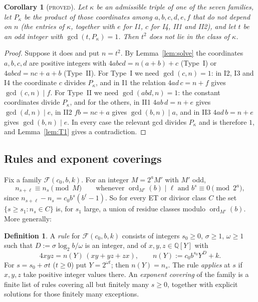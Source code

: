 \documentclass[11pt,reqno]{amsart}
\newtheorem{corollary}[theorem]{Corollary}
\theoremstyle{definition}
\newtheorem{definition}[theorem]{Definition}
\newcommand{\Q}{\mathbb Q}
\newcommand{\ord}{\operatorname{ord}}
\newcommand{\status}[1]{\textup{\textsc{#1}}}
\begin{document}
\begin{corollary}[\status{proved}]\label{cor:T1class}
Let $\kappa$ be an admissible triple of one of the seven families, let
$P_\kappa$ be the product of those coordinates among $a,b,c,d,e,f$ that do
not depend on $n$ \textup{(}the entries of $\kappa$, together with $e$ for
I1, $c$ for I4, II1 and II2\textup{)}, and let $t$ be an odd integer with
$\gcd(t,P_\kappa)=1$.  Then $t^2$ does not lie in the class of $\kappa$.
\end{corollary}

\begin{proof}
Suppose it does and put $n=t^2$.  By Lemma~\ref{lem:solve} the coordinates
$a,b,c,d$ are positive integers with $4abcd=n(a+b)+c$ (Type~I) or
$4abcd=nc+a+b$ (Type~II).  For Type~I we need $\gcd(c,n)=1$: in I2, I3 and
I4 the coordinate $c$ divides $P_\kappa$, and in I1 the relation $4ad\,c=n+f$
gives $\gcd(c,n)\mid f$.  For Type~II we need $\gcd(abd,n)=1$: the
constant coordinates divide $P_\kappa$, and for the others, in II1
$4ab\,d=n+e$ gives $\gcd(d,n)\mid e$, in II2 $fb=nc+a$ gives
$\gcd(b,n)\mid a$, and in II3 $4ad\,b=n+e$ gives $\gcd(b,n)\mid e$.  In
every case the relevant gcd divides $P_\kappa$ and is therefore $1$, and
Lemma~\ref{lem:T1} gives a contradiction.
\end{proof}

\subsection{Rules and exponent coverings}
Fix a family $\mathcal F(c_0,b,k)$.  For an integer $M=2^aM'$ with $M'$ odd,
\begin{equation}\label{eq:period}
 n_{s+\ell}\equiv n_s \pmod{M}\qquad\text{whenever } \ord_{M'}(b)\mid \ell \text{ and } b^s\equiv0\pmod{2^a},
\end{equation}
since $n_{s+\ell}-n_s=c_0b^s(b^\ell-1)$.  So for every ET or divisor class
$C$ the set $\{s\ge s_1: n_s\in C\}$ is, for $s_1$ large, a union of
residue classes modulo $\ord_{M'}(b)$.  More generally:

\begin{definition}\label{def:rule}
A \emph{rule} for $\mathcal F(c_0,b,k)$ consists of integers $s_0\ge0$,
$\sigma\ge1$, $\omega\ge1$ such that $D:=\sigma\log_2 b/\omega$ is an integer,
and of $x,y,z\in\Q[Y]$ with
\[
 4xyz=n(Y)\,(xy+yz+zx),\qquad n(Y):=c_0b^{s_0}Y^D+k .
\]
For $s=s_0+\sigma t$ ($t\ge0$) put $Y=2^{\omega t}$; then $n(Y)=n_s$.  The
rule \emph{applies} at $s$ if $x,y,z$ take positive integer values there.
An \emph{exponent covering} of the family is a finite list of rules covering
all but finitely many $s\ge0$, together with explicit solutions for those
finitely many exceptions.%
\end{definition}
\end{document}
